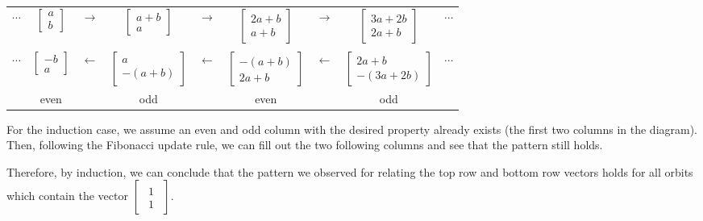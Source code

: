 \documentclass[a4paper, 12pt, reqno]{amsart}
\begin{document}
			\begin{tabular}{*{9}{c}}
				$\cdots$ &
				$\begin{bmatrix}
					a \\
					b
				\end{bmatrix}$ &
				$\rightarrow$ &
				$\begin{bmatrix}
					a+b \\
					a
				\end{bmatrix}$ &
				$\rightarrow$ &
				$\begin{bmatrix}
					2a+b \\
					a+b
				\end{bmatrix}$ &
				$\rightarrow$ &
				$\begin{bmatrix}
					3a+2b \\
					2a+b
				\end{bmatrix}$ &
				$\cdots$ \\
				&&&& \\
				$\cdots$ &
				$\begin{bmatrix}
					-b \\
					a
				\end{bmatrix}$ &
				$\leftarrow$ &
				$\begin{bmatrix}
					a \\
					-(a+b)
				\end{bmatrix}$ &
				$\leftarrow$ &
				$\begin{bmatrix}
					-(a+b) \\
					2a+b
				\end{bmatrix}$ &
				$\leftarrow$ &
				$\begin{bmatrix}
					 2a+b\\
					-(3a+2b)
				\end{bmatrix}$ &
				$\cdots$ \\
				& even && odd && even && odd &
			\end{tabular}
			
			For the induction case, we assume an even and odd column with the desired property already exists
			(the first two columns in the diagram). Then, following the Fibonacci update rule, we can fill
			out the two following columns and see that the pattern still holds.
			
			Therefore, by induction, we can conclude that the pattern we observed for relating the top row and
			bottom row vectors holds for all orbits which contain the vector
			$
				\begin{bmatrix}
					\begin{smallmatrix}
						1 \\
						1
					\end{smallmatrix}
				\end{bmatrix}
			$.
			
\end{document}
